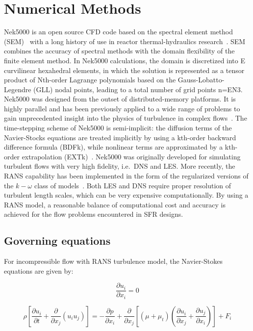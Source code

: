 \section{Numerical Methods}
\label{sec:nekrs}

Nek5000 is an open source CFD code based on the spectral element method (SEM)~\citep{Patera1984} with a long history of use in reactor thermal-hydraulics research~\citep{Merzari2019a}.
SEM combines the accuracy of spectral methods with the domain flexibility of the finite element method.
In Nek5000 calculations, the domain is discretized into E curvilinear hexahedral elements, in which the solution is represented as a tensor product of Nth-order Lagrange polynomials based on the Gauss-Lobatto-Legendre (GLL) nodal points, leading to a total number of grid points n=EN3.
Nek5000 was designed from the outset of distributed-memory platforms.
It is highly parallel and has been previously applied to a wide range of problems to gain unprecedented insight into the physics of turbulence in complex flows~\citep{Merzari2019,Martinez2019}.
The time-stepping scheme of Nek5000 is semi-implicit: the diffusion terms of the Navier-Stocks equations are treated implicitly by using a kth-order backward difference formula (BDFk), while nonlinear terms are approximated by a kth-order extrapolation (EXTk)~\citep{Ho1989}.
Nek5000 was originally developed for simulating turbulent flows with very high fidelity, i.e.\ DNS and LES.
More recently, the RANS capability has been implemented in the form of the regularized versions of the $k-\omega$ class of models~\citep{Tomboulides2018}.
Both LES and DNS require proper resolution of turbulent length scales, which can be very expensive computationally.
By using a RANS model, a reasonable balance of computational cost and accuracy is achieved for the flow problems encountered in SFR designs.


\subsection{Governing equations}
\label{sec:nek1}
For incompressible flow with RANS turbulence model, the Navier-Stokes equations are given by:

\begin{equation}
    \frac{\partial u_i}{\partial x_i}  =  0
\end{equation}

\begin{equation}
 \rho \left[ \frac{\partial u_i}{\partial t} + \frac{\partial }{\partial x_j}(u_i u_j) \right] =  -\frac{\partial p}{\partial x_i} + \frac{\partial }{\partial x_j}\left[(\mu + \mu_t)( \frac{\partial u_i}{\partial x_j} + \frac{\partial u_j}{\partial x_i})\right] + F_i
\end{equation}

